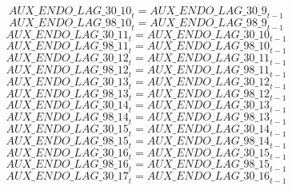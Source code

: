 \begin{dmath}
{AUX\_ENDO\_LAG\_30\_10}_{t}={AUX\_ENDO\_LAG\_30\_9}_{t-1}
\end{dmath}
\begin{dmath}
{AUX\_ENDO\_LAG\_98\_10}_{t}={AUX\_ENDO\_LAG\_98\_9}_{t-1}
\end{dmath}
\begin{dmath}
{AUX\_ENDO\_LAG\_30\_11}_{t}={AUX\_ENDO\_LAG\_30\_10}_{t-1}
\end{dmath}
\begin{dmath}
{AUX\_ENDO\_LAG\_98\_11}_{t}={AUX\_ENDO\_LAG\_98\_10}_{t-1}
\end{dmath}
\begin{dmath}
{AUX\_ENDO\_LAG\_30\_12}_{t}={AUX\_ENDO\_LAG\_30\_11}_{t-1}
\end{dmath}
\begin{dmath}
{AUX\_ENDO\_LAG\_98\_12}_{t}={AUX\_ENDO\_LAG\_98\_11}_{t-1}
\end{dmath}
\begin{dmath}
{AUX\_ENDO\_LAG\_30\_13}_{t}={AUX\_ENDO\_LAG\_30\_12}_{t-1}
\end{dmath}
\begin{dmath}
{AUX\_ENDO\_LAG\_98\_13}_{t}={AUX\_ENDO\_LAG\_98\_12}_{t-1}
\end{dmath}
\begin{dmath}
{AUX\_ENDO\_LAG\_30\_14}_{t}={AUX\_ENDO\_LAG\_30\_13}_{t-1}
\end{dmath}
\begin{dmath}
{AUX\_ENDO\_LAG\_98\_14}_{t}={AUX\_ENDO\_LAG\_98\_13}_{t-1}
\end{dmath}
\begin{dmath}
{AUX\_ENDO\_LAG\_30\_15}_{t}={AUX\_ENDO\_LAG\_30\_14}_{t-1}
\end{dmath}
\begin{dmath}
{AUX\_ENDO\_LAG\_98\_15}_{t}={AUX\_ENDO\_LAG\_98\_14}_{t-1}
\end{dmath}
\begin{dmath}
{AUX\_ENDO\_LAG\_30\_16}_{t}={AUX\_ENDO\_LAG\_30\_15}_{t-1}
\end{dmath}
\begin{dmath}
{AUX\_ENDO\_LAG\_98\_16}_{t}={AUX\_ENDO\_LAG\_98\_15}_{t-1}
\end{dmath}
\begin{dmath}
{AUX\_ENDO\_LAG\_30\_17}_{t}={AUX\_ENDO\_LAG\_30\_16}_{t-1}
\end{dmath}
